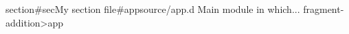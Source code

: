 section#sec{My section}
  file#app{source/app.d}
    Main module in which...
  fragment-addition{>app}
